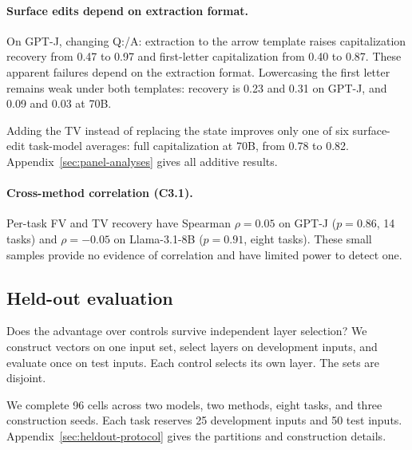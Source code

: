 \documentclass[11pt]{article}
\begin{document}
\begin{table}[t]
  \centering
  \small
  \setlength{\tabcolsep}{4pt}
  
  \caption{Exploratory control recovery at the real TV's best layer; additive TV selects its own best layer. Means across cells.}
  \label{tab:tv-controls}
\end{table}

\paragraph{Surface edits depend on extraction format.} On GPT-J, changing Q:/A: extraction to the arrow template raises capitalization recovery from 0.47 to 0.97 and first-letter capitalization from 0.40 to 0.87. These apparent failures depend on the extraction format. Lowercasing the first letter remains weak under both templates: recovery is 0.23 and 0.31 on GPT-J, and 0.09 and 0.03 at 70B.

Adding the TV instead of replacing the state improves only one of six surface-edit task-model averages: full capitalization at 70B, from 0.78 to 0.82. Appendix~\ref{sec:panel-analyses} gives all additive results.

\paragraph{Cross-method correlation (C3.1).} Per-task FV and TV recovery have Spearman $\rho=0.05$ on GPT-J ($p=0.86$, 14 tasks) and $\rho=-0.05$ on Llama-3.1-8B ($p=0.91$, eight tasks). These small samples provide no evidence of correlation and have limited power to detect one.

\subsection{Held-out evaluation}
\label{sec:heldout}

Does the advantage over controls survive independent layer selection? We construct vectors on one input set, select layers on development inputs, and evaluate once on test inputs. Each control selects its own layer. The sets are disjoint.

We complete 96 cells across two models, two methods, eight tasks, and three construction seeds. Each task reserves 25 development inputs and 50 test inputs. Appendix~\ref{sec:heldout-protocol} gives the partitions and construction details.

\begin{table}[t]
  \centering
  \small
  \setlength{\tabcolsep}{4pt}
  
  \caption{Held-out method-minus-control accuracy (percentage points). Each control selects its own layer; 95\% CIs bootstrap eight task means.}
  \label{tab:heldout}
\end{table}
\end{document}
